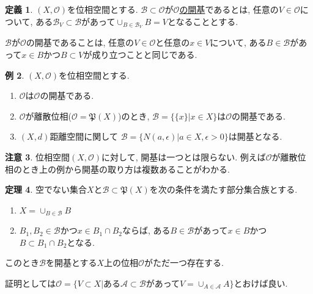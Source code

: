 \documentclass[dvipdfmx,a4paper,11pt]{article}
\theoremstyle{definition}
\newtheorem{thm}{定理}
\newtheorem{dfn}[thm]{定義}
\newtheorem{rem}[thm]{注意}
\newtheorem{exa}[thm]{例}
\begin{document}
 \begin{tcolorbox}[
    colback = white,
    colframe = green!35!black,
    fonttitle = \bfseries,
    breakable = true]
    \begin{dfn}
$(X, \mathscr{O})$を位相空間とする. $\mathscr{B} \subset \mathscr{O}$が\underline{$\mathscr{O}$の開基}であるとは, 任意の$V \in \mathscr{O}$について, ある$\mathscr{B}_{V} \subset \mathscr{B}$があって$\cup_{B \in \mathscr{B}_{V}}B =V$となることとする.
  \end{dfn}
 \end{tcolorbox}
$\mathscr{B}$が$\mathscr{O}$の開基であることは, 任意の$V \in \mathscr{O}$と任意の$x \in V$について, ある$B \in \mathscr{B}$があって$x \in B$かつ$B \subset V$が成り立つことと同じである. 

\begin{exa}
$(X, \mathscr{O})$を位相空間とする.
\begin{enumerate}
\item$\mathscr{O}$は$\mathscr{O}$の開基である.
\item$\mathscr{O}$が離散位相($\mathscr{O} = \mathfrak{P}(X)$)のとき, $\mathscr{B}=\{ \{x\}  | x \in X\}$は$\mathscr{O}$の開基である.
\item $(X,d)$距離空間に関して
$\mathscr{B} = \{ N(a,\epsilon) | a \in X, \epsilon >0\}
$は開基となる.
\end{enumerate}
\end{exa}

\begin{rem}
位相空間$(X, \mathscr{O})$に対して, 開基は一つとは限らない. 例えば$\mathscr{O}$が離散位相のとき上の例から開基の取り方は複数あることがわかる.
\end{rem}

    \begin{tcolorbox}[
    colback = white,
    colframe = green!35!black,
    fonttitle = \bfseries,
    breakable = true]
    \begin{thm}
    \label{kaiki}
空でない集合$X$と$\mathscr{B} \subset \mathfrak{P}(X)$を次の条件を満たす部分集合族とする.
\begin{enumerate}
 \setlength{\parskip}{0cm} 
  \setlength{\itemsep}{0cm} 
\item $X = \cup_{B \in \mathscr{B} }B$
\item $B_1, B_2\in \mathscr{B} $かつ$x \in B_1\cap B_2$ならば, ある$B \in \mathscr{B}$があって$x\in B$かつ$B \subset B_1\cap B_2$となる.
\end{enumerate}
このとき$\mathscr{B}$を開基とする$X$上の位相$\mathscr{O}$がただ一つ存在する.
\end{thm}
 \end{tcolorbox}
証明としては$ \mathscr{O} = \{ V\subset X | \text{ある$\mathscr{A} \subset \mathscr{B}$があって$V=\cup_{A \in \mathscr{A}}A$}  \}$とおけば良い.
\end{document}
